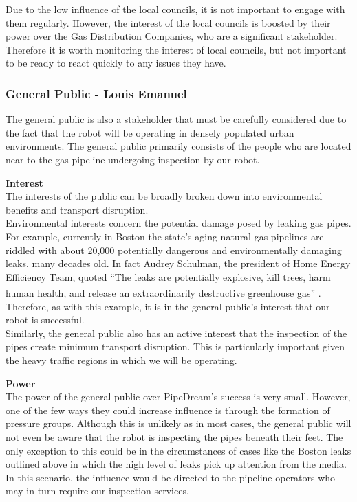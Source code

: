 \documentclass[11pt]{article}		%
\newcommand{\supercite}[1]{\textsuperscript{\cite{#1}}}		%
\begin{document}
		    Due to the low influence of the local councils, it is not important to engage with them regularly.
		    However, the interest of the local councils is boosted by their power over the Gas Distribution Companies, who are a significant stakeholder.
		    Therefore it is worth monitoring the interest of local councils, but not important to be ready to react quickly to any issues they have.
		
		\subsubsection[General Public]{General Public - Louis Emanuel}
			The general public is also a stakeholder that must be carefully considered due to the fact that the robot will be operating in densely populated urban environments. The general public primarily consists of the people who are located near to the gas pipeline undergoing inspection by our robot.
			
			\textbf{Interest}\\
	        The interests of the public can be broadly broken down into environmental benefits and transport disruption.\\
		    \hspace*{3ex}Environmental interests concern the potential damage posed by leaking gas pipes. For example, currently in Boston the state’s aging natural gas pipelines are riddled with about 20,000 potentially dangerous and environmentally damaging leaks, many decades old. In fact Audrey Schulman, the president of Home Energy Efficiency Team, quoted  “The leaks are potentially explosive, kill trees, harm human health, and release an extraordinarily destructive greenhouse gas” \supercite{leaks}. Therefore, as with this example, it is in the general public's interest that our robot is successful. \\
	        \hspace*{3ex}Similarly, the general public also has an active interest that the inspection of the pipes create minimum transport disruption. This is particularly important given the heavy traffic regions in which we will be operating. 
	        
	        \textbf{Power}\\
	        The power of the general public over PipeDream's success is very small. However, one of the few ways they could increase influence is through the formation of pressure groups. Although this is unlikely as in most cases, the general public will not even be aware that the robot is inspecting the pipes beneath their feet. The only exception to this could be in the circumstances of cases like the Boston leaks outlined above in which the high level of leaks pick up attention from the media. In this scenario, the influence would be directed to the pipeline operators who may in turn require our inspection services.
	        
\end{document}
